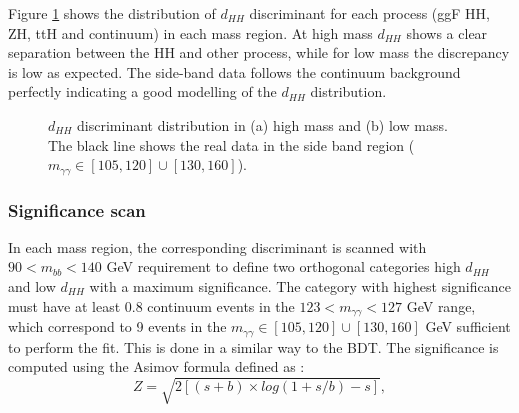 Figure \ref{fig:HHyybb:ObjEvt:DNN:dHH} shows the distribution of $d_{HH}$ discriminant for each process (ggF HH, ZH, ttH and continuum) in each mass region. At high mass $d_{HH}$ shows a clear separation between the HH and other process, while for low mass the discrepancy is low as expected. The side-band data follows the continuum background perfectly indicating a good modelling of the $d_{HH}$ distribution. 
\begin{figure}[htbp]
    \centering
    \begin{tcolorbox}[colback=black!5!white,colframe=white!75!black]
    \caption{$d_{HH}$ discriminant distribution in (a) high mass and (b) low mass. The black line shows the real data in the side band region ($m_{\gamma\gamma}\in[105,120] \cup [130,160]$).}
    \label{fig:HHyybb:ObjEvt:DNN:dHH}
    \end{tcolorbox}
    
\end{figure}

\subsubsection{Significance scan}
In each mass region, the corresponding discriminant is scanned with $90<m_{bb}<140$ GeV requirement to define two orthogonal categories high $d_{HH}$ and low $d_{HH}$ with a maximum significance. The category with highest significance must have at least 0.8 continuum events in the $123<m_{\gamma\gamma}<127$ GeV range, which correspond to 9 events in the $m_{\gamma\gamma}\in[105,120] \cup [130,160]$ GeV sufficient to perform the \myy fit. This is done in a similar way to the BDT. The significance is computed using the Asimov formula \cite{Z} defined as : 
\begin{equation}
    Z = \sqrt{2\left[(s+b)\times log(1+s/b)-s\right]},
\end{equation}

